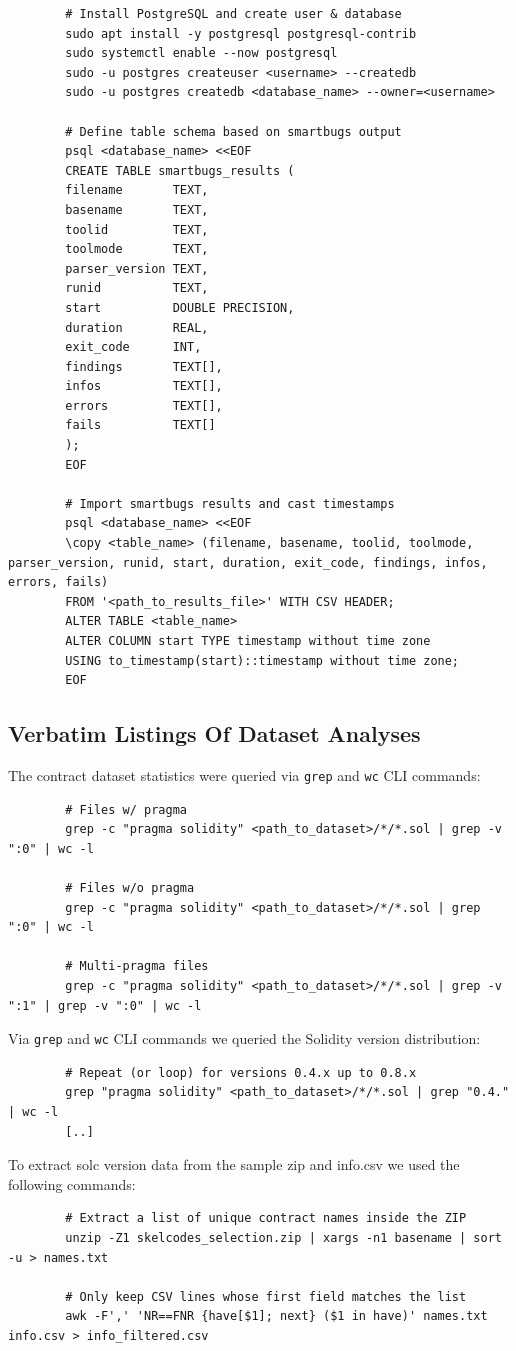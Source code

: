 \documentclass{article}
\begin{document}
	\begin{verbatim}
		# Install PostgreSQL and create user & database
		sudo apt install -y postgresql postgresql-contrib
		sudo systemctl enable --now postgresql
		sudo -u postgres createuser <username> --createdb
		sudo -u postgres createdb <database_name> --owner=<username>

		# Define table schema based on smartbugs output
		psql <database_name> <<EOF
		CREATE TABLE smartbugs_results (
		filename       TEXT,
		basename       TEXT,
		toolid         TEXT,
		toolmode       TEXT,
		parser_version TEXT,
		runid          TEXT,
		start          DOUBLE PRECISION,
		duration       REAL,
		exit_code      INT,
		findings       TEXT[],
		infos          TEXT[],
		errors         TEXT[],
		fails          TEXT[]
		);
		EOF

		# Import smartbugs results and cast timestamps
		psql <database_name> <<EOF
		\copy <table_name> (filename, basename, toolid, toolmode, parser_version, runid, start, duration, exit_code, findings, infos, errors, fails)
		FROM '<path_to_results_file>' WITH CSV HEADER;
		ALTER TABLE <table_name>
		ALTER COLUMN start TYPE timestamp without time zone
		USING to_timestamp(start)::timestamp without time zone;
		EOF
	\end{verbatim}

	\subsection*{Verbatim Listings Of Dataset Analyses}
	The contract dataset statistics were queried via \texttt{grep} and \texttt{wc} CLI commands:
	\begin{verbatim}
		# Files w/ pragma
		grep -c "pragma solidity" <path_to_dataset>/*/*.sol | grep -v ":0" | wc -l

		# Files w/o pragma
		grep -c "pragma solidity" <path_to_dataset>/*/*.sol | grep ":0" | wc -l

		# Multi-pragma files
		grep -c "pragma solidity" <path_to_dataset>/*/*.sol | grep -v ":1" | grep -v ":0" | wc -l
	\end{verbatim}

	Via \texttt{grep} and \texttt{wc} CLI commands we queried the Solidity version distribution:
	\begin{verbatim}
		# Repeat (or loop) for versions 0.4.x up to 0.8.x
		grep "pragma solidity" <path_to_dataset>/*/*.sol | grep "0.4." | wc -l
		[..]
	\end{verbatim}

	To extract solc version data from the sample zip and info.csv we used the following commands:
	\begin{verbatim}
		# Extract a list of unique contract names inside the ZIP
		unzip -Z1 skelcodes_selection.zip | xargs -n1 basename | sort -u > names.txt

		# Only keep CSV lines whose first field matches the list
		awk -F',' 'NR==FNR {have[$1]; next} ($1 in have)' names.txt info.csv > info_filtered.csv
	\end{verbatim}
\end{document}
